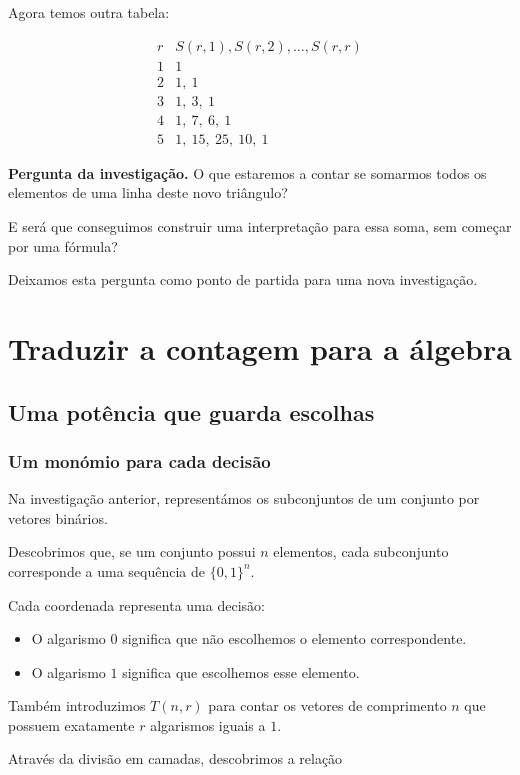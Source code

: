 \documentclass[11pt,a4paper,oneside]{book}
\newcommand{\Pergunta}[1]{\begin{perguntabox}\textbf{Pergunta da investigação.} #1\end{perguntabox}}
\begin{document}
Agora temos outra tabela:

\[
\begin{array}{c|l}
r & S(r,1),S(r,2),\ldots,S(r,r)\\
\hline
1 & 1\\
2 & 1,\ 1\\
3 & 1,\ 3,\ 1\\
4 & 1,\ 7,\ 6,\ 1\\
5 & 1,\ 15,\ 25,\ 10,\ 1
\end{array}
\]

\Pergunta{O que estaremos a contar
se somarmos todos os elementos
de uma linha deste novo triângulo?}

E será que conseguimos construir
uma interpretação para essa soma,
sem começar por uma fórmula?

Deixamos esta pergunta como ponto
de partida para uma nova investigação.

\part{Traduzir a contagem para a álgebra}
\chapter{Uma potência que guarda escolhas}

\section*{Um monómio para cada decisão}

Na investigação anterior, representámos os subconjuntos
de um conjunto por vetores binários.

Descobrimos que, se um conjunto possui $n$ elementos,
cada subconjunto corresponde a uma sequência de
$\{0,1\}^n$.

Cada coordenada representa uma decisão:

\begin{itemize}
    \item O algarismo $0$ significa que não escolhemos
    o elemento correspondente.
    \item O algarismo $1$ significa que escolhemos
    esse elemento.
\end{itemize}

Também introduzimos $T(n,r)$ para contar os vetores
de comprimento $n$ que possuem exatamente $r$
algarismos iguais a $1$.

Através da divisão em camadas, descobrimos a relação
\end{document}

